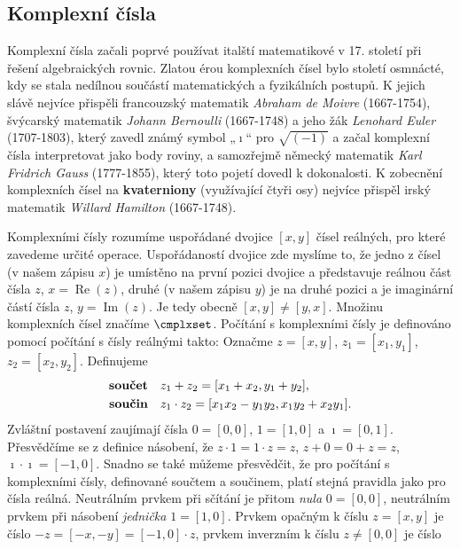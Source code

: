     \subsection{Komplexní čísla}\label{mai:IchapIIsecIIsubII}
      Komplexní čísla začali poprvé používat italští matematikové v 17. století při řešení
      algebraických rovnic. Zlatou érou komplexních čísel bylo století osmnácté, kdy se stala
      nedílnou součástí matematických a fyzikálních postupů. K jejich slávě nejvíce přispěli
      francouzský matematik \emph{Abraham de Moivre} (1667-1754), švýcarský matematik \emph{Johann
      Bernoulli} (1667-1748) a jeho žák \emph{Lenohard Euler} (1707-1803), který zavedl známý symbol
      „\(\imath\)“ pro \(\sqrt{(−1)}\) a začal komplexní čísla interpretovat jako body roviny, a
      samozřejmě německý matematik \emph{Karl Fridrich Gauss} (1777-1855), který toto pojetí dovedl
      k dokonalosti. K zobecnění komplexních čísel na \textbf{kvaterniony} (využívající čtyři osy)
      nejvíce přispěl irský matematik \emph{Willard Hamilton} (1667-1748).
      \cite[s.~5]{Kulhanek2018}

      Komplexními čísly rozumíme uspořádané dvojice \([x, y]\) čísel reálných, pro které zavedeme 
      určité operace. Uspořádaností dvojice zde myslíme to, že jedno z čísel (v našem zápisu \(x\)) 
      je umístěno na první pozici dvojice a představuje reálnou část čísla \(z\), \(x = 
      \operatorname{Re}(z)\), druhé (v našem zápisu \(y\)) je na druhé pozici a je imaginární částí 
      čísla \(z\), \(y = \operatorname{Im}(z)\). Je tedy obecně  \([x, y] ≠ [y, x]\). Množinu
      komplexních čísel značíme \(\cmplxset\). Počítání s komplexními čísly je definováno pomocí 
      počítání s čísly reálnými takto: Označme \(z = [x, y]\), \(z_1 = [x_1, y_1]\), \(z_2 = 
      [x_2, y_2]\). Definujeme
      \begin{align*}
        \text{\textbf{součet}}\quad & z_1 + z_2 = [x_1 + x_2, y_1 + y_2],               \\
        \text{\textbf{součin}}\quad & z_1 \cdot z_2  = [x_1x_2-y_1y_2, x_1y_2+x_2y_1]. 
      \end{align*}
      Zvláštní postavení zaujímají čísla \(0 = [0, 0]\), \(1 = [1, 0]\) a \(\imath = [0, 1]\).
      Přesvědčíme se z definice násobení, že \(z \cdot 1 = 1 \cdot z = z\), \(z + 0 = 0 + z = z\),
      \(\imath \cdot \imath = [-1, 0]\). Snadno se také můžeme přesvědčit, že pro počítání s
      komplexními čísly, definované součtem a součinem, platí stejná pravidla jako pro čísla reálná.
      Neutrálním prvkem při sčítání je přitom \emph{nula} \(0 = [0, 0]\), neutrálním prvkem při
      násobení \emph{jednička} \(1 = [1, 0]\). Prvkem opačným k číslu \(z = [x, y]\) je číslo \(-z =
      [-x, -y] = [-1, 0] \cdot z\), prvkem inverzním k číslu \(z\neq [0, 0]\) je číslo
      
